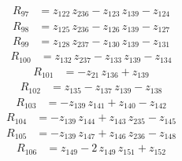 \begin{equation*}\begin{aligned}
R_{97}&=z_{122}\,z_{236} -z_{123}\,z_{139} -z_{124}
\end{aligned}\end{equation*}
\begin{equation*}\begin{aligned}
R_{98}&=z_{125}\,z_{236} -z_{126}\,z_{139} -z_{127}
\end{aligned}\end{equation*}
\begin{equation*}\begin{aligned}
R_{99}&=z_{128}\,z_{237} -z_{130}\,z_{139} -z_{131}
\end{aligned}\end{equation*}
\begin{equation*}\begin{aligned}
R_{100}&=z_{132}\,z_{237} -z_{133}\,z_{139} -z_{134}
\end{aligned}\end{equation*}
\begin{equation*}\begin{aligned}
R_{101}&=-z_{21}\,z_{136} +z_{139}
\end{aligned}\end{equation*}
\begin{equation*}\begin{aligned}
R_{102}&=z_{135} -z_{137}\,z_{139} -z_{138}
\end{aligned}\end{equation*}
\begin{equation*}\begin{aligned}
R_{103}&=-z_{139}\,z_{141} +z_{140} -z_{142}
\end{aligned}\end{equation*}
\begin{equation*}\begin{aligned}
R_{104}&=-z_{139}\,z_{144} +z_{143}\,z_{235} -z_{145}
\end{aligned}\end{equation*}
\begin{equation*}\begin{aligned}
R_{105}&=-z_{139}\,z_{147} +z_{146}\,z_{236} -z_{148}
\end{aligned}\end{equation*}
\begin{equation*}\begin{aligned}
R_{106}&=z_{149} -2\,z_{149}\,z_{151} +z_{152}
\end{aligned}\end{equation*}
